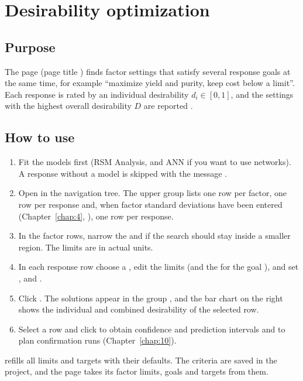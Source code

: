 \section{Desirability optimization}
\label{sec:ch08-desirability}

\subsection{Purpose}
The  page (page title ) finds factor settings that satisfy several
response goals at the same time, for example ``maximize yield and purity, keep cost below a limit''. Each response
is rated by an individual desirability $d_i\in[0,1]$, and the settings with the highest overall desirability $D$
are reported \citep{derringer1980,myers2016}.

\subsection{How to use}
\begin{enumerate}
  \item Fit the models first (RSM Analysis, and ANN if you want to use networks). A response without a model is
        skipped with the message .
  \item Open  in the navigation tree. The upper group  lists one row
        per factor, one row per response and, when factor standard deviations have been entered (Chapter~\ref{chap:4},
        ), one  row per response.
  \item In the factor rows, narrow the  and  if the search should stay inside a
        smaller region. The limits are in actual units.
  \item In each response row choose a , edit the limits (and the  for the goal
        ), and set ,  and .
  \item Click . The solutions appear in the group ,
        and the bar chart on the right shows the individual and combined desirability of the selected row.
  \item Select a row and click  to obtain confidence and prediction
        intervals and to plan confirmation runs (Chapter~\ref{chap:10}).
\end{enumerate}
 refills all limits and targets with their defaults. The criteria are saved in the project,
and the  page takes its factor limits, goals and targets from them.

